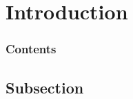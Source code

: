 \section{Introduction}
    \begin{frame}
        \frametitle{Contents}
        \tableofcontents
    \end{frame}

    \begin{frame}
        \tableofcontents[currentsection]
    \end{frame}

\subsection{Subsection}
